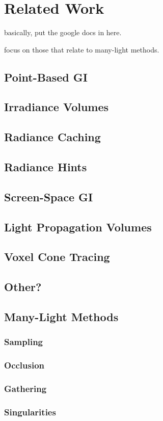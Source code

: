 
\chapter{Related Work}

basically, put the google docs in here.

focus on those that relate to many-light methods.


\section{Point-Based GI}

\section{Irradiance Volumes}

\section{Radiance Caching}

\section{Radiance Hints}

\section{Screen-Space GI}

\section{Light Propagation Volumes}

\section{Voxel Cone Tracing}

\section{Other?}


\section{Many-Light Methods}

\subsection{Sampling}

\subsection{Occlusion}

\subsection{Gathering}

\subsection{Singularities}




\cleardoublepage
